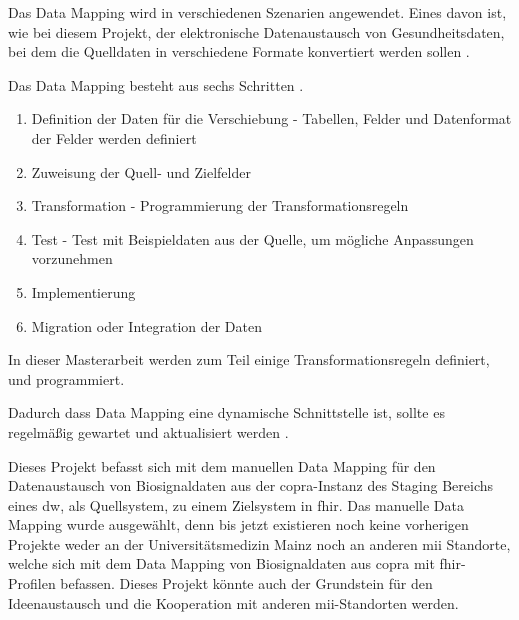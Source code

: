 Das Data Mapping wird in verschiedenen Szenarien angewendet. Eines davon ist, wie bei diesem Projekt, der elektronische Datenaustausch von Gesundheitsdaten, bei dem die Quelldaten in verschiedene Formate konvertiert werden sollen \cite{datamappingastera}.

Das Data Mapping besteht aus sechs Schritten \cite{datamappingtalend}. 
\begin{enumerate}
  \item Definition der Daten für die Verschiebung - Tabellen, Felder und Datenformat der Felder werden definiert
  \item Zuweisung der Quell- und Zielfelder
  \item Transformation - Programmierung der Transformationsregeln
  \item Test - Test mit Beispieldaten aus der Quelle, um mögliche Anpassungen vorzunehmen
  \item Implementierung 
  \item Migration oder Integration der Daten
\end{enumerate}

In dieser Masterarbeit werden zum Teil einige Transformationsregeln definiert, und programmiert.

Dadurch dass Data Mapping eine dynamische Schnittstelle ist, sollte es regelmäßig gewartet und aktualisiert werden \cite{datamappingtalend}.

Dieses Projekt befasst sich mit dem manuellen Data Mapping für den Datenaustausch von Biosignaldaten aus der \ac{copra}-Instanz des Staging Bereichs eines \ac{dw}, als Quellsystem, zu einem Zielsystem in \ac{fhir}. Das manuelle Data Mapping wurde ausgewählt, denn bis jetzt existieren noch keine vorherigen Projekte weder an der Universitätsmedizin Mainz noch an anderen \ac{mii} Standorte, welche sich mit dem Data Mapping von Biosignaldaten aus \ac{copra} mit \ac{fhir}-Profilen befassen. Dieses Projekt könnte auch der Grundstein für den Ideenaustausch und die Kooperation mit anderen \ac{mii}-Standorten werden.
